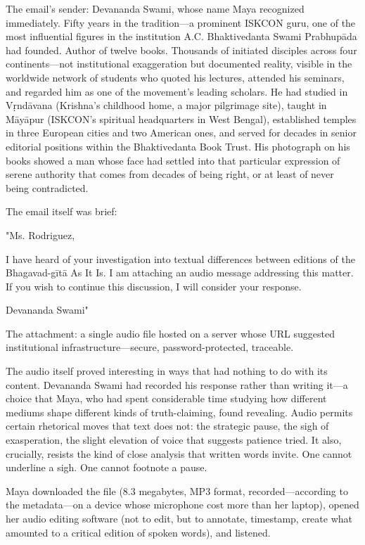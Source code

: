 \documentclass[12pt]{article}
\begin{document}
The email's sender: Devananda Swami, whose name Maya recognized immediately. Fifty years in the tradition—a prominent ISKCON guru, one of the most influential figures in the institution A.C. Bhaktivedanta Swami Prabhupāda had founded. Author of twelve books. Thousands of initiated disciples across four continents—not institutional exaggeration but documented reality, visible in the worldwide network of students who quoted his lectures, attended his seminars, and regarded him as one of the movement's leading scholars. He had studied in Vṛndāvana (Krishna's childhood home, a major pilgrimage site), taught in Māyāpur (ISKCON's spiritual headquarters in West Bengal), established temples in three European cities and two American ones, and served for decades in senior editorial positions within the Bhaktivedanta Book Trust. His photograph on his books showed a man whose face had settled into that particular expression of serene authority that comes from decades of being right, or at least of never being contradicted.

The email itself was brief:

"Ms. Rodriguez,

I have heard of your investigation into textual differences between editions of the Bhagavad-gītā As It Is. I am attaching an audio message addressing this matter. If you wish to continue this discussion, I will consider your response.

Devananda Swami"

The attachment: a single audio file hosted on a server whose URL suggested institutional infrastructure—secure, password-protected, traceable.

The audio itself proved interesting in ways that had nothing to do with its content. Devananda Swami had recorded his response rather than writing it—a choice that Maya, who had spent considerable time studying how different mediums shape different kinds of truth-claiming, found revealing. Audio permits certain rhetorical moves that text does not: the strategic pause, the sigh of exasperation, the slight elevation of voice that suggests patience tried. It also, crucially, resists the kind of close analysis that written words invite. One cannot underline a sigh. One cannot footnote a pause.

Maya downloaded the file (8.3 megabytes, MP3 format, recorded—according to the metadata—on a device whose microphone cost more than her laptop), opened her audio editing software (not to edit, but to annotate, timestamp, create what amounted to a critical edition of spoken words), and listened.
\end{document}
